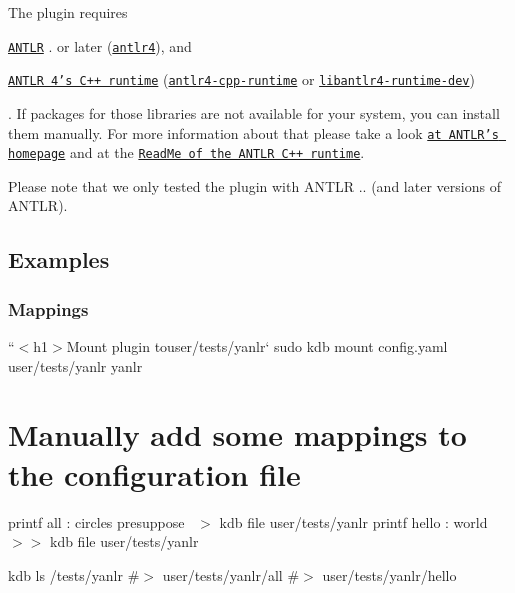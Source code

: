 The plugin requires


\begin{DoxyItemize}
\item \href{https://www.antlr.org}{\tt A\+N\+T\+LR} {.} or later (\href{https://repology.org/metapackage/antlr4}{\tt {\ttfamily antlr4}}), and
\item \href{https://github.com/antlr/antlr4/tree/master/runtime/Cpp}{\tt A\+N\+T\+LR 4’s C++ runtime} (\href{https://repology.org/metapackage/antlr4-cpp-runtime}{\tt {\ttfamily antlr4-\/cpp-\/runtime}} or \href{https://packages.debian.org/search?searchon=names&keywords=libantlr4-runtime-dev}{\tt {\ttfamily libantlr4-\/runtime-\/dev}})
\end{DoxyItemize}

. If packages for those libraries are not available for your system, you can install them manually. For more information about that please take a look \href{https://www.antlr.org}{\tt at A\+N\+T\+L\+R’s homepage} and at the \href{https://github.com/antlr/antlr4/tree/master/runtime/Cpp}{\tt Read\+Me of the A\+N\+T\+LR C++ runtime}.

Please note that we only tested the plugin with A\+N\+T\+LR {..} (and later versions of A\+N\+T\+LR).

\subsection*{Examples}

\subsubsection*{Mappings}

``{\ttfamily  $<$h1$>$Mount plugin to}user/tests/yanlr` sudo kdb mount config.\+yaml user/tests/yanlr yanlr

\section*{Manually add some mappings to the configuration file}

printf \textquotesingle{}all \+: circles presuppose~\newline
\textquotesingle{} $>$ {\ttfamily kdb file user/tests/yanlr} printf \textquotesingle{}hello \+: world~\newline
\textquotesingle{} $>$$>$ {\ttfamily kdb file user/tests/yanlr}

kdb ls /tests/yanlr \#$>$ user/tests/yanlr/all \#$>$ user/tests/yanlr/hello

